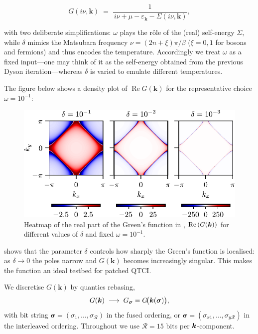 \begin{equation}
  G(i\nu,\mathbf{k})
  \;=\;
  \frac{1}
       {\,i\nu+\mu-\varepsilon_{\mathbf{k}}-\Sigma(i\nu,\mathbf{k})},
\end{equation}

with two deliberate simplifications:
\(\omega\) plays the rôle of the (real) self-energy
\(\Sigma\), while \(\delta\) mimics the Matsubara frequency
\(\nu=(2n+\xi)\pi/\beta\) ($\xi=0,1$ for bosons and fermions) and thus encodes the temperature.
Accordingly we treat \(\omega\) as a fixed input—one may think of it as the self-energy obtained from the previous Dyson iteration—whereas \(\delta\) is varied to emulate different temperatures.

The figure below shows a density plot of
\(\operatorname{Re}G(\mathbf{k})\) for the representative choice
\(\omega=10^{-1}\):

\begin{figure}[ht!]
    \centering
    \includegraphics{figures/realGreenHeatmap.pdf}
    \caption{Heatmap of the real part of the Green's function in , $\text{Re}\left(G(\boldsymbol{k})\right)$ for different values of $\delta$ and fixed $\omega=10^{-1}$. }
    \label{fig:realGreenHeatmap}
\end{figure}

 shows that the parameter \(\delta\) controls how sharply the Green’s function is localised: as \(\delta\to 0\) the poles narrow and \(G(\mathbf{k})\) becomes increasingly singular.  This makes the function an ideal testbed for patched QTCI.

We discretise \(G(\mathbf{k})\) by quantics rebasing,  
\begin{equation}
  G(\boldsymbol{k})
  \;\longrightarrow\;
  G_{\boldsymbol{\sigma}} = G\!\bigl(\boldsymbol{k}(\boldsymbol{\sigma})\bigr),
\end{equation}
with bit string
\(\boldsymbol{\sigma}=(\sigma_{1},\dots,\sigma_{\mathcal R})\) in the fused
ordering, or \(\boldsymbol{\sigma}=(\sigma_{x1},\dots,\sigma_{y\mathcal R})\) in the interleaved ordering.  
Throughout we use \(\mathcal R=15\) bits per \(\boldsymbol{k}\)-component.

